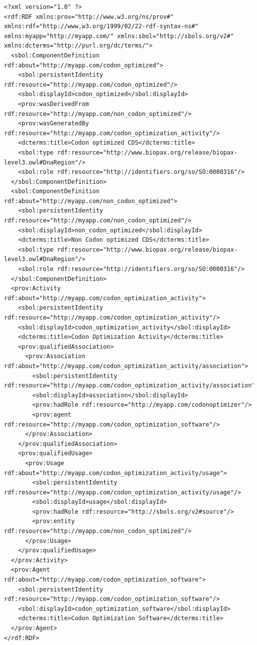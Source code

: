 \begin{lstlisting}
<?xml version="1.0" ?>
<rdf:RDF xmlns:prov="http://www.w3.org/ns/prov#" xmlns:rdf="http://www.w3.org/1999/02/22-rdf-syntax-ns#" xmlns:myapp="http://myapp.com/" xmlns:sbol="http://sbols.org/v2#" xmlns:dcterms="http://purl.org/dc/terms/">
  <sbol:ComponentDefinition rdf:about="http://myapp.com/codon_optimized">
    <sbol:persistentIdentity rdf:resource="http://myapp.com/codon_optimized"/>
    <sbol:displayId>codon_optimized</sbol:displayId>
    <prov:wasDerivedFrom rdf:resource="http://myapp.com/non_codon_optimized"/>
    <prov:wasGeneratedBy rdf:resource="http://myapp.com/codon_optimization_activity"/>
    <dcterms:title>Codon optimized CDS</dcterms:title>
    <sbol:type rdf:resource="http://www.biopax.org/release/biopax-level3.owl#DnaRegion"/>
    <sbol:role rdf:resource="http://identifiers.org/so/SO:0000316"/>
  </sbol:ComponentDefinition>
  <sbol:ComponentDefinition rdf:about="http://myapp.com/non_codon_optimized">
    <sbol:persistentIdentity rdf:resource="http://myapp.com/non_codon_optimized"/>
    <sbol:displayId>non_codon_optimized</sbol:displayId>
    <dcterms:title>Non Codon optimized CDS</dcterms:title>
    <sbol:type rdf:resource="http://www.biopax.org/release/biopax-level3.owl#DnaRegion"/>
    <sbol:role rdf:resource="http://identifiers.org/so/SO:0000316"/>
  </sbol:ComponentDefinition>
  <prov:Activity rdf:about="http://myapp.com/codon_optimization_activity">
    <sbol:persistentIdentity rdf:resource="http://myapp.com/codon_optimization_activity"/>
    <sbol:displayId>codon_optimization_activity</sbol:displayId>
    <dcterms:title>Codon Optimization Activity</dcterms:title>
    <prov:qualifiedAssociation>
      <prov:Association rdf:about="http://myapp.com/codon_optimization_activity/association">
        <sbol:persistentIdentity rdf:resource="http://myapp.com/codon_optimization_activity/association"/>
        <sbol:displayId>association</sbol:displayId>
        <prov:hadRole rdf:resource="http://myapp.com/codonoptimizer"/>
        <prov:agent rdf:resource="http://myapp.com/codon_optimization_software"/>
      </prov:Association>
    </prov:qualifiedAssociation>
    <prov:qualifiedUsage>
      <prov:Usage rdf:about="http://myapp.com/codon_optimization_activity/usage">
        <sbol:persistentIdentity rdf:resource="http://myapp.com/codon_optimization_activity/usage"/>
        <sbol:displayId>usage</sbol:displayId>
        <prov:hadRole rdf:resource="http://sbols.org/v2#source"/>
        <prov:entity rdf:resource="http://myapp.com/non_codon_optimized"/>
      </prov:Usage>
    </prov:qualifiedUsage>
  </prov:Activity>
  <prov:Agent rdf:about="http://myapp.com/codon_optimization_software">
    <sbol:persistentIdentity rdf:resource="http://myapp.com/codon_optimization_software"/>
    <sbol:displayId>codon_optimization_software</sbol:displayId>
    <dcterms:title>Codon Optimization Software</dcterms:title>
  </prov:Agent>
</rdf:RDF>
\end{lstlisting}

